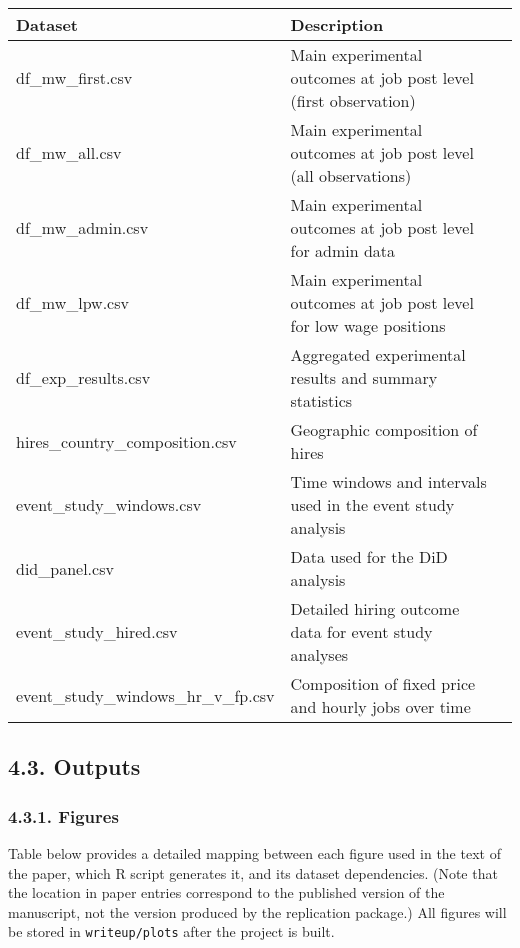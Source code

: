 \documentclass[10pt]{article}
\newenvironment{eightpt}{\begingroup\fontsize{8}{13}\selectfont}{\endgroup}
\begin{document}
\begin{eightpt}
\begin{tabularx}{\textwidth}{T@{}p{0.5\textwidth}p{0.5\textwidth}@{}}
\toprule
Dataset & Description \\
\midrule
{df\_mw\_first.csv} & Main experimental outcomes at job post level (first observation) \\
{df\_mw\_all.csv} & Main experimental outcomes at job post level (all observations) \\
{df\_mw\_admin.csv} & Main experimental outcomes at job post level for admin data \\
{df\_mw\_lpw.csv} & Main experimental outcomes at job post level for low wage positions \\
{df\_exp\_results.csv} & Aggregated experimental results and summary statistics \\
{hires\_country\_composition.csv} & Geographic composition of hires \\
{event\_study\_windows.csv} & Time windows and intervals used in the event study analysis \\
{did\_panel.csv} & Data used for the DiD analysis \\
{event\_study\_hired.csv} & Detailed hiring outcome data for event study analyses \\
{event\_study\_windows\_hr\_v\_fp.csv} & Composition of fixed price and hourly jobs over time \\
\bottomrule
\end{tabularx}
\end{eightpt}


\subsection*{4.3. Outputs}

\subsubsection*{4.3.1. Figures}

Table below provides a detailed mapping between each figure used in the text of the paper, which R script generates it, and its dataset dependencies. 
(Note that the location in paper entries correspond to the published version of the manuscript, not the version produced by the replication package.)
All figures will be stored in \texttt{writeup/plots} after the project is built.
\end{document}
